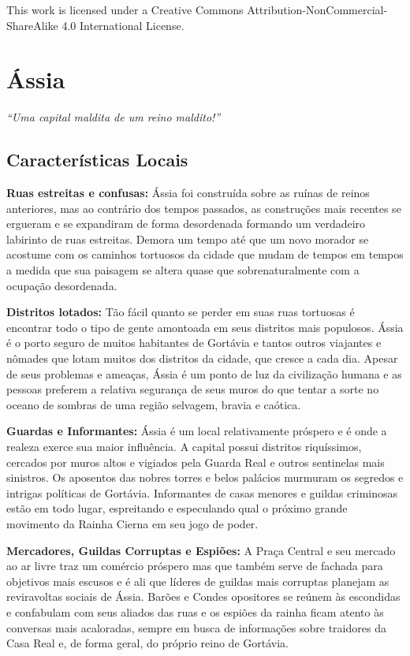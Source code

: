 \documentclass{article}
\begin{document}
This work is licensed under a Creative Commons Attribution-NonCommercial-ShareAlike 4.0 International License.

\section{Ássia}

\textit{“Uma capital maldita de um reino maldito!”}

\subsection{Características Locais}

\textbf{Ruas estreitas e confusas:} Ássia foi construída sobre as ruínas de reinos anteriores, mas ao contrário dos tempos passados, as construções mais recentes se ergueram e se expandiram de forma desordenada formando um verdadeiro labirinto de ruas estreitas. Demora um tempo até que um novo morador se acostume com os caminhos tortuosos da cidade que mudam de tempos em tempos a medida que sua paisagem se altera quase que sobrenaturalmente com a ocupação desordenada.

\textbf{Distritos lotados:} Tão fácil quanto se perder em suas ruas tortuosas é encontrar todo o tipo de gente amontoada em seus distritos mais populosos. Ássia é o porto seguro de muitos habitantes de Gortávia e tantos outros viajantes e nômades que lotam muitos dos distritos da cidade, que cresce a cada dia. Apesar de seus problemas e ameaças, Ássia é um ponto de luz da civilização humana e as pessoas preferem a relativa segurança de seus muros do que tentar a sorte no oceano de sombras de uma região selvagem, bravia e caótica. 

\textbf{Guardas e Informantes:} Ássia é um local relativamente próspero e é onde a realeza exerce sua maior influência. A capital possui distritos riquíssimos, cercados por muros altos e vigiados pela Guarda Real e outros sentinelas mais sinistros. Os aposentos das nobres torres e belos palácios  murmuram os segredos e intrigas políticas de Gortávia. Informantes de casas menores e guildas criminosas estão em todo lugar, espreitando e especulando qual o próximo grande movimento da Rainha Cierna em seu jogo de poder. 

\textbf{Mercadores, Guildas Corruptas e Espiões:} A Praça Central e seu mercado ao ar livre traz um comércio próspero mas que também serve de fachada para objetivos mais escusos e é ali que líderes de guildas mais corruptas planejam as reviravoltas sociais de Ássia. Barões e Condes opositores se reúnem às escondidas e confabulam com seus aliados das ruas e os espiões da rainha ficam atento às conversas mais acaloradas, sempre em busca de informações sobre traidores da Casa Real e, de forma geral, do próprio reino de Gortávia.
\end{document}

